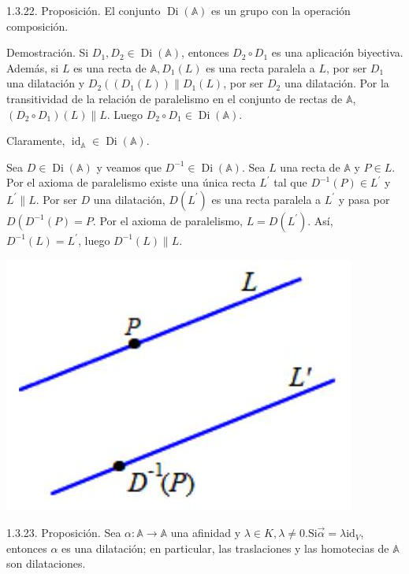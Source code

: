 \documentclass[12pt, a4paper, ones, notitlepage, openany,titlepage]{article}
\begin{document}
1.3.22. Proposición. El conjunto $\operatorname{Di}(\mathbb{A})$ es un grupo con la operación composición.

Demostración. Si $D_{1}, D_{2} \in \operatorname{Di}(\mathbb{A})$, entonces $D_{2} \circ D_{1}$ es una aplicación biyectiva. Además, si $L$ es una recta de $\mathbb{A}, D_{1}(L)$ es una recta paralela a $L$, por ser $D_{1}$ una dilatación y $D_{2}\left(\left(D_{1}(L)\right) \| D_{1}(L)\right.$, por ser $D_{2}$ una dilatación. Por la transitividad de la relación de paralelismo en el conjunto de rectas de $\mathbb{A}$, $\left(D_{2} \circ D_{1}\right)(L) \| L$. Luego $D_{2} \circ D_{1} \in \operatorname{Di}(\mathbb{A})$.

Claramente, $\operatorname{id}_{\mathbb{A}} \in \operatorname{Di}(\mathbb{A})$.

Sea $D \in \operatorname{Di}(\mathbb{A})$ y veamos que $D^{-1} \in \operatorname{Di}(\mathbb{A})$. Sea $L$ una recta de $\mathbb{A}$ y $P \in L$. Por el axioma de paralelismo existe una única recta $L^{\prime}$ tal que $D^{-1}(P) \in L^{\prime}$ y $L^{\prime} \| L$. Por ser $D$ una dilatación, $D\left(L^{\prime}\right)$ es una recta paralela a $L^{\prime}$ y pasa por $D\left(D^{-1}(P)=P\right.$. Por el axioma de paralelismo, $L=D\left(L^{\prime}\right)$. Así, $D^{-1}(L)=L^{\prime}$, luego $D^{-1}(L) \| L$.

\begin{center}
\includegraphics[max width=\textwidth]{2023_03_01_7659aec5e35f9a9b2d3cg-29}
\end{center}

1.3.23. Proposición. Sea $\alpha: \mathbb{A} \rightarrow \mathbb{A}$ una afinidad y $\lambda \in K, \lambda \neq 0 . \mathrm{Si} \vec{\alpha}=\lambda \mathrm{id}_{V}$, entonces $\alpha$ es una dilatación; en particular, las traslaciones y las homotecias de $\mathbb{A}$ son dilataciones.
\end{document}
